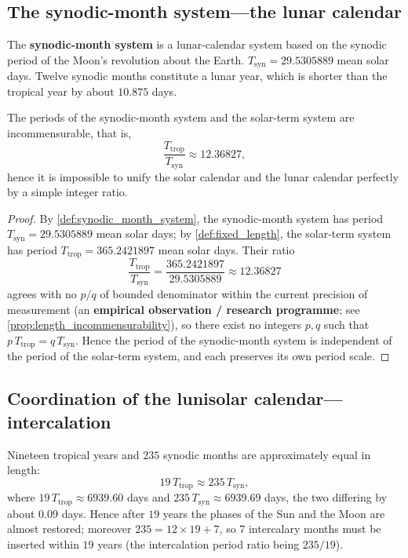 \subsection{The synodic-month system---the lunar calendar}

\begin{definition}\label{def:synodic_month_system}
The \textbf{synodic-month system} is a lunar-calendar system based on the synodic period of the Moon's revolution about the Earth. \(T_{\text{syn}}=29.5305889\) mean solar days. Twelve synodic months constitute a lunar year, which is shorter than the tropical year by about \(10.875\) days.
\end{definition}

\begin{proposition}\label{prop:synodic_month_conservation}
The periods of the synodic-month system and the solar-term system are incommensurable, that is,
\[
\frac{T_{\text{trop}}}{T_{\text{syn}}}\approx 12.36827,
\]
hence it is impossible to unify the solar calendar and the lunar calendar perfectly by a simple integer ratio.
\end{proposition}

\begin{proof}
By \cref{def:synodic_month_system}, the synodic-month system has period \(T_{\text{syn}}=29.5305889\) mean solar days; by \cref{def:fixed_length}, the solar-term system has period \(T_{\text{trop}}=365.2421897\) mean solar days. Their ratio
\[
\frac{T_{\text{trop}}}{T_{\text{syn}}}=\frac{365.2421897}{29.5305889}\approx 12.36827
\]
agrees with no \(p/q\) of bounded denominator within the current precision of measurement (an \textbf{empirical observation / research programme}; see \cref{prop:length_incommensurability}), so there exist no integers \(p,q\) such that \(p\,T_{\text{trop}}=q\,T_{\text{syn}}\). Hence the period of the synodic-month system is independent of the period of the solar-term system, and each preserves its own period scale.
\end{proof}

\subsection{Coordination of the lunisolar calendar---intercalation}

\begin{lemma}\label{ch18_metonic_cycle}
Nineteen tropical years and \(235\) synodic months are approximately equal in length:
\[
19\,T_{\text{trop}}\approx 235\,T_{\text{syn}},
\]
where \(19\,T_{\text{trop}}\approx 6939.60\) days and \(235\,T_{\text{syn}}\approx 6939.69\) days, the two differing by about \(0.09\) days. Hence after \(19\) years the phases of the Sun and the Moon are almost restored; moreover \(235=12\times 19+7\), so \(7\) intercalary months must be inserted within \(19\) years (the intercalation period ratio being \(235/19\)).
\end{lemma}

